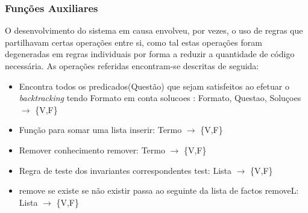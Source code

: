 \documentclass{article}
\begin{document}
\subsubsection{Funções Auxiliares}
O desenvolvimento do sistema em causa envolveu, por vezes, o uso de regras que partilhavam certas operações entre si, como tal estas operações foram degeneradas em regras individuais por forma a reduzir a quantidade de código necessária. As operações referidas encontram-se descritas de seguida:
\begin{itemize}
	\item Encontra todos os predicados(Questão) que sejam satisfeitos ao efetuar o \textit{backtracking} tendo Formato em conta
\newline
solucoes : Formato, Questao, Soluçoes $\to$ \{V,F\}
	\item Função para somar uma lista      
\newline
inserir: Termo $\to$ \{V,F\}
	\item Remover conhecimento
\newline
remover: Termo $\to$ \{V,F\}
	\item Regra de teste dos invariantes correspondentes
\newline
test: Lista $\to$ \{V,F\}
	\item remove se existe se não existir passa ao seguinte da lista de factos
\newline
removeL: Lista $\to$ \{V,F\}
\end{itemize}
\end{document}
